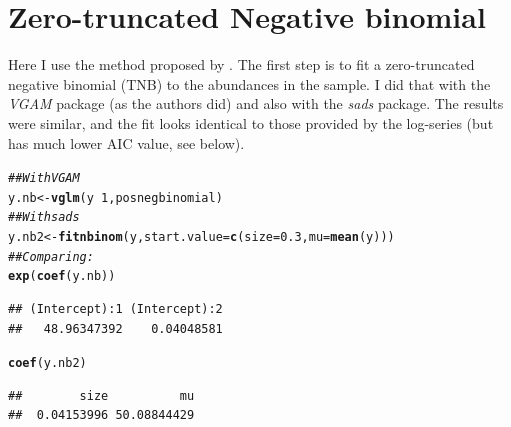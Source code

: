\documentclass[12pt, A4]{article}\usepackage[]{graphicx}\usepackage[]{color}
\makeatletter
\newcommand{\hlnum}[1]{\textcolor[rgb]{0.686,0.059,0.569}{#1}}%
\newcommand{\hlcom}[1]{\textcolor[rgb]{0.678,0.584,0.686}{\textit{#1}}}%
\newcommand{\hlopt}[1]{\textcolor[rgb]{0,0,0}{#1}}%
\newcommand{\hlstd}[1]{\textcolor[rgb]{0.345,0.345,0.345}{#1}}%
\newcommand{\hlkwb}[1]{\textcolor[rgb]{0.69,0.353,0.396}{#1}}%
\newcommand{\hlkwc}[1]{\textcolor[rgb]{0.333,0.667,0.333}{#1}}%
\newcommand{\hlkwd}[1]{\textcolor[rgb]{0.737,0.353,0.396}{\textbf{#1}}}%
\newenvironment{kframe}{%
 \def\at@end@of@kframe{}%
 \ifinner\ifhmode%
  \def\at@end@of@kframe{\end{minipage}}%
  \begin{minipage}{\columnwidth}%
 \fi\fi%
 \def\FrameCommand##1{\hskip\@totalleftmargin \hskip-\fboxsep
 \colorbox{shadecolor}{##1}\hskip-\fboxsep
     \hskip-\linewidth \hskip-\@totalleftmargin \hskip\columnwidth}%
 \MakeFramed {\advance\hsize-\width
   \@totalleftmargin\z@ \linewidth\hsize
   \@setminipage}}%
 {\par\unskip\endMakeFramed%
 \at@end@of@kframe}
\newenvironment{knitrout}{}{} %
\makeatother
\begin{document}
\section{Zero-truncated Negative binomial}
\label{sec:negbin}

Here I use the method proposed by \citet{tovo2017}. The first step is
to fit a zero-truncated negative binomial (TNB) to the abundances in the sample.
I did that with the \emph{VGAM} package (as the authors did)
and also with the \emph{sads} package. 
The results were similar, and the fit looks identical to
those provided by the log-series (but has much lower AIC value, see below).
 
\begin{knitrout}
\color{fgcolor}\begin{kframe}
\begin{alltt}
\hlcom{## With VGAM}
\hlstd{y.nb} \hlkwb{<-} \hlkwd{vglm}\hlstd{(y} \hlopt{~} \hlnum{1}\hlstd{, posnegbinomial)}
\hlcom{## With sads}
\hlstd{y.nb2} \hlkwb{<-} \hlkwd{fitnbinom}\hlstd{(y,} \hlkwc{start.value}\hlstd{=}\hlkwd{c}\hlstd{(}\hlkwc{size}\hlstd{=}\hlnum{0.3}\hlstd{,} \hlkwc{mu}\hlstd{=}\hlkwd{mean}\hlstd{(y)))}
\hlcom{## Comparing: }
\hlkwd{exp}\hlstd{(}\hlkwd{coef}\hlstd{(y.nb))}
\end{alltt}
\begin{verbatim}
## (Intercept):1 (Intercept):2 
##   48.96347392    0.04048581
\end{verbatim}
\begin{alltt}
\hlkwd{coef}\hlstd{(y.nb2)}
\end{alltt}
\begin{verbatim}
##        size          mu 
##  0.04153996 50.08844429
\end{verbatim}
\end{kframe}
\end{knitrout}
\end{document}

